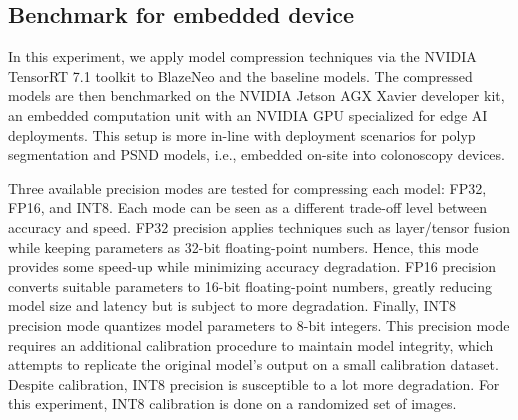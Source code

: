 \documentclass{ieeeaccess}
\newcommand{\ModelName}{BlazeNeo\xspace}
\begin{document}
\subsection{Benchmark for embedded device}
In this experiment, we apply model compression techniques via the NVIDIA TensorRT 7.1 toolkit \cite{tensorrt} to \ModelName and the baseline models. The compressed models are then benchmarked on the NVIDIA Jetson AGX Xavier developer kit, an embedded computation unit with an NVIDIA GPU specialized for edge AI deployments. This setup is more in-line with deployment scenarios for polyp segmentation and PSND models, i.e., embedded on-site into colonoscopy devices.

Three available precision modes are tested for compressing each model: FP32, FP16, and INT8. Each mode can be seen as a different trade-off level between accuracy and speed. FP32 precision applies techniques such as layer/tensor fusion while keeping parameters as 32-bit floating-point numbers. Hence, this mode provides some speed-up while minimizing accuracy degradation. FP16 precision converts suitable parameters to 16-bit floating-point numbers, greatly reducing model size and latency but is subject to more degradation. Finally, INT8 precision mode quantizes model parameters to 8-bit integers. This precision mode requires an additional calibration procedure to maintain model integrity, which attempts to replicate the original model's output on a small calibration dataset. Despite calibration, INT8 precision is susceptible to a lot more degradation. For this experiment, INT8 calibration is done on a randomized set of images.
\end{document}

